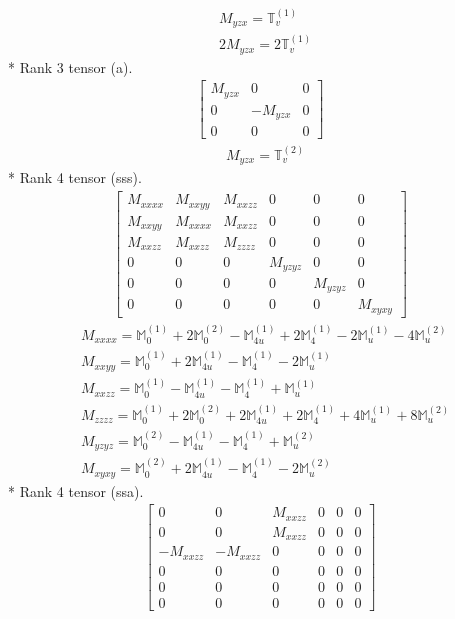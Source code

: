 \documentclass[fleqn,8pt,landscape]{jsarticle}
\begin{document}
\begin{align*}
& M_{yzx} = \mathbb{T}_{v}^{(1)} \\
& 2 M_{yzx} = 2 \mathbb{T}_{v}^{(1)}
\end{align*}
* Rank 3 tensor (a).
\begin{align*}
\begin{bmatrix} M_{yzx} & 0 & 0 \\ 0 & - M_{yzx} & 0 \\ 0 & 0 & 0 \end{bmatrix}
\end{align*}
\begin{align*}
& M_{yzx} = \mathbb{T}_{v}^{(2)}
\end{align*}
* Rank 4 tensor (sss).
\begin{align*}
\begin{bmatrix} M_{xxxx} & M_{xxyy} & M_{xxzz} & 0 & 0 & 0 \\ M_{xxyy} & M_{xxxx} & M_{xxzz} & 0 & 0 & 0 \\ M_{xxzz} & M_{xxzz} & M_{zzzz} & 0 & 0 & 0 \\ 0 & 0 & 0 & M_{yzyz} & 0 & 0 \\ 0 & 0 & 0 & 0 & M_{yzyz} & 0 \\ 0 & 0 & 0 & 0 & 0 & M_{xyxy} \end{bmatrix}
\end{align*}
\begin{align*}
& M_{xxxx} = \mathbb{M}_{0}^{(1)} + 2 \mathbb{M}_{0}^{(2)} - \mathbb{M}_{4u}^{(1)} + 2 \mathbb{M}_{4}^{(1)} - 2 \mathbb{M}_{u}^{(1)} - 4 \mathbb{M}_{u}^{(2)} \\
& M_{xxyy} = \mathbb{M}_{0}^{(1)} + 2 \mathbb{M}_{4u}^{(1)} - \mathbb{M}_{4}^{(1)} - 2 \mathbb{M}_{u}^{(1)} \\
& M_{xxzz} = \mathbb{M}_{0}^{(1)} - \mathbb{M}_{4u}^{(1)} - \mathbb{M}_{4}^{(1)} + \mathbb{M}_{u}^{(1)} \\
& M_{zzzz} = \mathbb{M}_{0}^{(1)} + 2 \mathbb{M}_{0}^{(2)} + 2 \mathbb{M}_{4u}^{(1)} + 2 \mathbb{M}_{4}^{(1)} + 4 \mathbb{M}_{u}^{(1)} + 8 \mathbb{M}_{u}^{(2)} \\
& M_{yzyz} = \mathbb{M}_{0}^{(2)} - \mathbb{M}_{4u}^{(1)} - \mathbb{M}_{4}^{(1)} + \mathbb{M}_{u}^{(2)} \\
& M_{xyxy} = \mathbb{M}_{0}^{(2)} + 2 \mathbb{M}_{4u}^{(1)} - \mathbb{M}_{4}^{(1)} - 2 \mathbb{M}_{u}^{(2)}
\end{align*}
* Rank 4 tensor (ssa).
\begin{align*}
\begin{bmatrix} 0 & 0 & M_{xxzz} & 0 & 0 & 0 \\ 0 & 0 & M_{xxzz} & 0 & 0 & 0 \\ - M_{xxzz} & - M_{xxzz} & 0 & 0 & 0 & 0 \\ 0 & 0 & 0 & 0 & 0 & 0 \\ 0 & 0 & 0 & 0 & 0 & 0 \\ 0 & 0 & 0 & 0 & 0 & 0 \end{bmatrix}
\end{align*}
\end{document}
